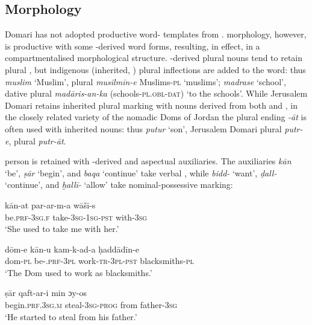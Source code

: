 \documentclass[output=paper]{langsci/langscibook}
\begin{document}
\subsection{Morphology}

Domari has not adopted productive word- templates from .   morphology, however, is productive with some -derived word forms, resulting, in effect, in a compartmentalised morphological structure. -derived plural nouns tend to retain  plural , but indigenous (inherited, ) plural inflections are added to the word: thus \textit{muslim} ‘Muslim’, plural \textit{musilmīn-e} Muslims-\textsc{pl} \textsc{‘}muslims’; \textit{madrase} ‘school’, dative plural \textit{madāris-an-ka}  (schools-\textsc{pl.obl-dat}) ‘to the schools’. While Jerusalem Domari retains inherited plural marking with nouns derived from both  and , in the closely related variety of the nomadic Doms of Jordan the  plural ending \textit{-āt} is often used with inherited nouns: thus \textit{putur} ‘son’, Jerusalem Domari plural \textit{putr-e},  plural \textit{putr-āt}.

 person   is retained with -derived  and aspectual auxiliaries. The auxiliaries \textit{kān} ‘be’, \textit{ṣār} ‘begin’, and \textit{baqa} ‘continue’ take  verbal , while \textit{bidd-} ‘want’, \textit{ḍall-} ‘continue’, and \textit{ḫallī-} ‘allow’ take  nominal-possessive marking:

\ea
\ea
\gll kān-at           par-ar-m-a        wāšī-s  \\
     be.\textsc{prf-3sg.f}   take-\textsc{3sg-1sg-pst}  with-\textsc{3sg}\\
\glt ‘She used to take me with her.’

\ex
\gll dōm-e kān-u kam-k-ad-a  {ḥ}addādīn-e\\
     dom-\textsc{pl} be-\textsc{.prf-3pl} work-\textsc{tr-3pl-pst} blacksmiths-\textsc{pl}\\
\glt ‘The Dom used to work as blacksmiths.’
\z
\z

\ea
\ea
\gll ṣār  qaft-ar-i  min  {ɔ}y-os\\
     begin.\textsc{prf.3sg.m} steal-\textsc{3sg-prog} from father-\textsc{3sg}\\
\glt ‘He started to steal from his father.’
\end{document}
